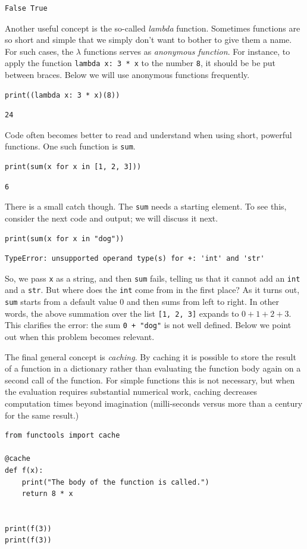 \documentclass[queueing-book]{subfiles}
\begin{document}
\begin{verbatim}
False True
\end{verbatim}

Another useful concept is the so-called \emph{lambda} function.
Sometimes functions are so short and simple that we simply don't want to bother to give them a name.
For such cases, the \(\lambda\) functions serves as \emph{anonymous function}.
For instance, to apply the function \texttt{lambda x: 3 * x} to the number \texttt{8}, it should be be put between braces.
Below we will use anonymous functions frequently.
\begin{verbatim}
print((lambda x: 3 * x)(8))
\end{verbatim}

\begin{verbatim}
24
\end{verbatim}

Code often becomes better to read and understand when using short, powerful functions. One such function is \texttt{sum}.
\begin{verbatim}
print(sum(x for x in [1, 2, 3]))
\end{verbatim}

\begin{verbatim}
6
\end{verbatim}

There is a small catch though.
The \texttt{sum} needs a starting element.
To see this, consider the next code and output; we will discuss it next.
\begin{verbatim}
print(sum(x for x in "dog"))
\end{verbatim}

\begin{verbatim}
TypeError: unsupported operand type(s) for +: 'int' and 'str'
\end{verbatim}

So, we pass \texttt{x} as a string, and then \texttt{sum} fails, telling us that it cannot add an \texttt{int} and a \texttt{str}.
But where does the \texttt{int} come from in the first place?
As it turns out, \texttt{sum} starts from a default value \(0\) and then sums from left to right.
In other words, the above summation over the list \texttt{[1, 2, 3]} expands to \(0 + 1 + 2 + 3\).
This clarifies the error:  the sum \texttt{0 + "dog"} is not well defined.
Below we point out when this problem becomes relevant.

The final general concept is \emph{caching}.
By caching it is possible to store the result of a function in a dictionary rather than evaluating the function body again on a second call of the function.
For simple functions this is not necessary, but when the evaluation requires substantial numerical work, caching decreases computation times beyond imagination (milli-seconds versus more than a century for the same result.)
\begin{verbatim}
from functools import cache

@cache
def f(x):
    print("The body of the function is called.")
    return 8 * x


print(f(3))
print(f(3))
\end{verbatim}
\end{document}
